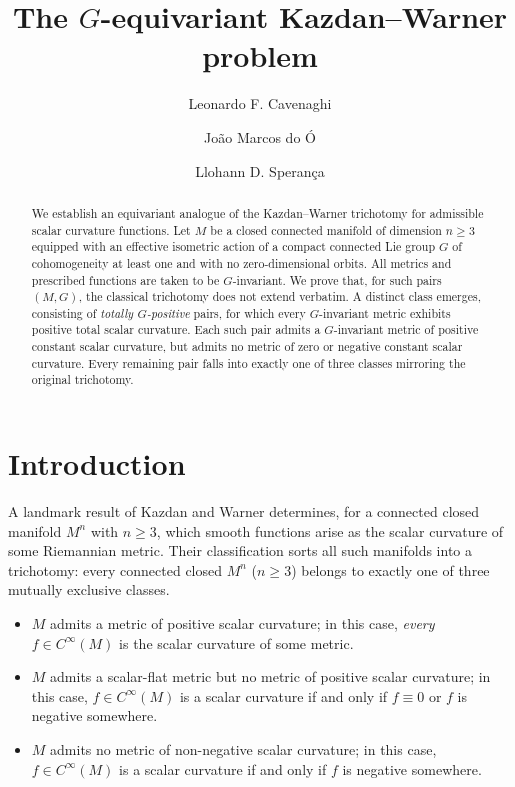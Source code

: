 \documentclass[12pt,a4paper]{amsart}
\title{The $G$-equivariant Kazdan--Warner problem}
\author[Cavenaghi]{Leonardo F. Cavenaghi}
\author[do \'O]{João Marcos do Ó}
\author[Speran\c ca]{Llohann D. Speran\c ca}
\theoremstyle{plain}
\theoremstyle{definition}
\theoremstyle{remark}
\begin{document}
\begin{abstract}
We establish an equivariant analogue of the Kazdan--Warner trichotomy for admissible scalar curvature functions. Let $M$ be a closed connected manifold of dimension $n \ge 3$ equipped with an effective isometric action of a compact connected Lie group $G$ of cohomogeneity at least one and with no zero-dimensional orbits. All metrics and prescribed functions are taken to be $G$-invariant. We prove that, for such pairs $(M, G)$, the classical trichotomy does not extend verbatim. A distinct class emerges, consisting of \emph{totally $G$-positive} pairs, for which every $G$-invariant metric exhibits positive total scalar curvature. Each such pair admits a $G$-invariant metric of positive constant scalar curvature, but admits no metric of zero or negative constant scalar curvature. Every remaining pair falls into exactly one of three classes mirroring the original trichotomy.
\end{abstract}

\maketitle

\section{Introduction}\label{sec:intro}

A landmark result of Kazdan and Warner \cite{kazadanannals} determines, for a connected closed manifold $M^n$ with $n \ge 3$, which smooth functions arise as the scalar curvature of some Riemannian metric. Their classification sorts all such manifolds into a trichotomy: every connected closed $M^n$ ($n \ge 3$) belongs to exactly one of three mutually exclusive classes.
\begin{itemize}
  \item[($\mathscr{P}$)] $M$ admits a metric of positive scalar curvature; in this case, \emph{every} $f \in C^\infty(M)$ is the scalar curvature of some metric.
  \item[($\mathscr{Z}$)] $M$ admits a scalar-flat metric but no metric of positive scalar curvature; in this case, $f \in C^\infty(M)$ is a scalar curvature if and only if $f \equiv 0$ or $f$ is negative somewhere.
  \item[($\mathscr{N}$)] $M$ admits no metric of non-negative scalar curvature; in this case, $f \in C^\infty(M)$ is a scalar curvature if and only if $f$ is negative somewhere.
\end{itemize}
\end{document}
